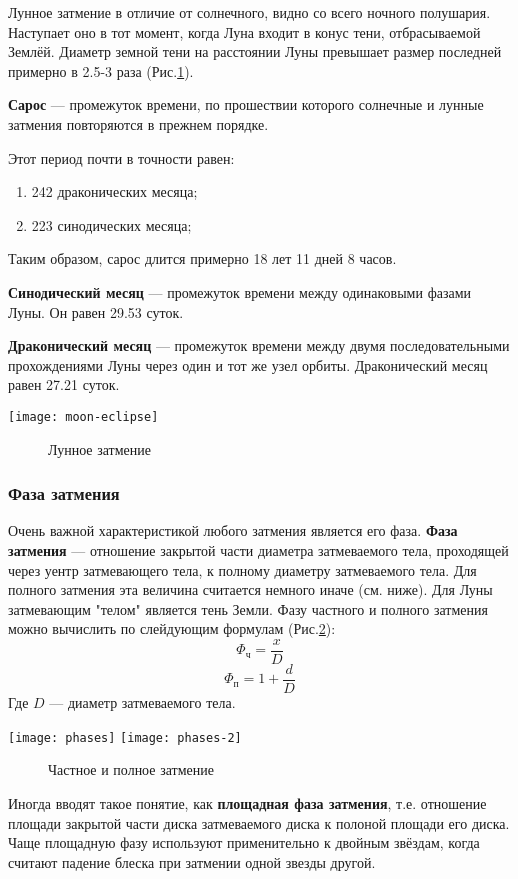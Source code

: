 Лунное затмение в отличие от солнечного, видно со всего ночного полушария. Наступает оно в тот момент, когда Луна входит в конус тени, отбрасываемой Землёй.  Диаметр земной тени на расстоянии Луны превышает размер последней примерно в 2.5-3 раза (Рис.\ref{moon-eclipse}).

\textbf{Сарос} --- промежуток  времени, по прошествии которого солнечные и лунные затмения повторяются в прежнем порядке.

Этот период почти в точности равен:
\begin{enumerate}
\item 242 драконических месяца;
\item 223 синодических месяца;
\end{enumerate}

Таким образом, сарос длится примерно 18 лет 11 дней 8 часов.

\textbf{Синодический месяц} --- промежуток времени между одинаковыми фазами Луны. Он равен 29.53 суток.

\textbf{Драконический месяц} --- промежуток времени между двумя последовательными прохождениями Луны через один и тот же узел орбиты. Драконический месяц равен 27.21 суток.
\begin{center}
\texttt{[image: moon-eclipse]}
\begin{figure}[h!]
\caption{Лунное затмение}\label{moon-eclipse}
\end{figure}
\end{center}
\subsubsection{Фаза затмения}
Очень важной характеристикой любого затмения является его фаза. \textbf{Фаза затмения} --- отношение закрытой части диаметра затмеваемого тела, проходящей через уентр затмевающего тела, к полному диаметру затмеваемого тела. Для полного затмения эта величина считается немного иначе (см. ниже). Для Луны затмевающим "телом" является тень Земли. Фазу частного и полного затмения можно вычислить по слейдующим формулам (Рис.\ref{phase}):
\begin{equation}\Phi_{\text{ч}}=\frac{x}{D}
\end{equation}  \begin{equation}\Phi_{\text{п}}=1+\frac{d}{D}
\end{equation}
Где $D$ --- диаметр затмеваемого тела.
\begin{center}
\texttt{[image: phases]}
\texttt{[image: phases-2]}
\begin{figure}[h!]
\caption{Частное и полное затмение}\label{phase}
\end{figure}
\end{center}

Иногда вводят такое понятие, как \textbf{площадная фаза затмения}, т.е. отношение площади закрытой части диска затмеваемого диска к полоной площади его диска. Чаще площадную фазу используют применительно к двойным звёздам, когда считают падение блеска при затмении одной звезды другой.